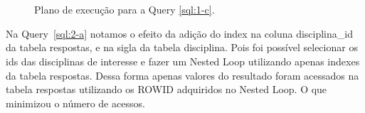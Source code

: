 \documentclass[a4paper,12pt]{article}
\begin{document}
\begin{figure}[hpt]
   \begin{center}
      \\
      \\
   \end{center}
   \caption{Plano de execução para a Query \ref{sql:1-c}.}
   \label{fig:plano_1-c}
\end{figure}

Na Query~\ref{sql:2-a} notamos o efeito da adição do index na coluna disciplina\_id
da tabela respostas, e na sigla da tabela disciplina. Pois foi possível selecionar
os ids das disciplinas de interesse e fazer um Nested Loop utilizando apenas
indexes da tabela respostas. Dessa forma apenas valores do resultado foram
acessados na tabela respostas utilizando os ROWID adquiridos no Nested Loop.
O que minimizou o número de acessos.

\begin{program}
   
   \caption{Questão 2-a.}
   \label{sql:2-a}
\end{program}
\end{document}
